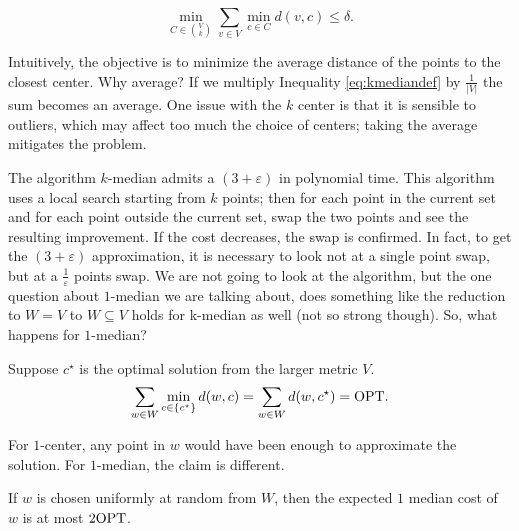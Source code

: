 \begin{equation}\label{eq:kmediandef}
	\min_{C \in \binom{V}{k}} \sum_{v \in V}\min_{c \in C}d(v, c) \leq \delta.
\end{equation} 

Intuitively, the objective is to minimize the average distance of the points to the closest center. Why average? If we multiply Inequality \ref{eq:kmediandef} by $\frac{1}{|V|}$ the sum becomes an average. One issue with the $k$ center is that it is sensible to outliers, which may affect too much the choice of centers; taking the average mitigates the problem.

The algorithm $k$-median admits a $(3+\varepsilon)$ in polynomial time. This algorithm uses a local search starting from $k$ points; then for each point in the current set and for each point outside the current set, swap the two points and see the resulting improvement. If the cost decreases, the swap is confirmed. In fact, to get the $(3 + \varepsilon)$ approximation, it is necessary to look not at a single point swap, but at a $\frac{1}{\varepsilon}$ points swap. We are not going to look at the algorithm, but the one question about $1$-median we are talking about, does something like the reduction to $W =V$ to $W \subseteq V$ holds for k-median as well (not so strong though). So, what happens for $1$-median?


Suppose $c^\star$ is the optimal solution from the larger metric $V$.
\begin{equation}
\sum_{w \in W} \min_{c \in \{c^\star\}} d(w, c) = \sum_{w \in W} d(w, c^\star) = \text{OPT}.
\end{equation}

For $1$-center, any point in $w$ would have been enough to approximate the solution. For $1$-median, the claim is different.

\begin{thm}
 If $w$ is chosen uniformly at random from $W$, then the expected $1$ median cost of $w$ is at most $2\text{OPT}$.
\end{thm}

